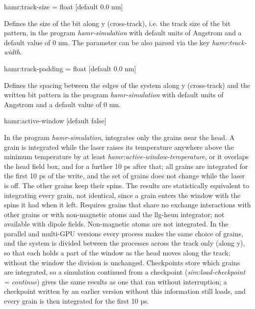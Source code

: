 {\zicf hamr:track-size = float [default $0.0$ nm]}
Defines the size of the bit along y (cross-track), i.e. the track size of the bit pattern,
in the program \textit{hamr-simulation} with default units of Angstrom and a default value of 0 nm.
The parameter can be also parsed via the key \textit{hamr:track-width}.

{\zicf hamr:track-padding = float [default $0.0$ nm]}
Defines the spacing between the edges of the system along y (cross-track) and the written bit pattern
in the program \textit{hamr-simulation} with default units of Angstrom and a default value of 0 nm.

{\zicf hamr:active-window [default false]}
In the program \textit{hamr-simulation}, integrates only the grains near the head. A grain is integrated while the laser raises its temperature anywhere above the minimum temperature by at least \textit{hamr:active-window-temperature}, or it overlaps the head field box, and for a further 10 ps after that; all grains are integrated for the first 10 ps of the write, and the set of grains does not change while the laser is off. The other grains keep their spins. The results are statistically equivalent to integrating every grain, not identical, since a grain enters the window with the spins it had when it left. Requires grains that share no exchange interactions with other grains or with non-magnetic atoms and the llg-heun integrator; not available with dipole fields. Non-magnetic atoms are not integrated. In the parallel and multi-GPU versions every process makes the same choice of grains, and the system is divided between the processes across the track only (along y), so that each holds a part of the window as the head moves along the track; without the window the division is unchanged. Checkpoints store which grains are integrated, so a simulation continued from a checkpoint (\textit{sim:load-checkpoint = continue}) gives the same results as one that ran without interruption; a checkpoint written by an earlier version without this information still loads, and every grain is then integrated for the first 10 ps.


